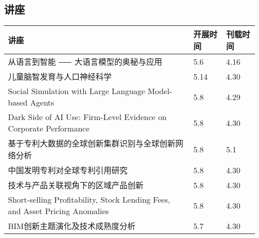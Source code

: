 \documentclass[letterpaper, 12pt]{article}
\begin{document}
\begin{multicols}{2}
\pagebreak

\section{讲座}
\begin{tabular}{|>{\centering\arraybackslash}m{}|m{}|m{}|}
    \hline
    讲座 & 开展时间 & 刊载时间\\
    \hline\hline
    从语言到智能 ⸺ 大语言模型的奥秘与应用 & 5.6 & 4.16\\\hline
    儿童脑智发育与人口神经科学 & 5.14 & 4.30\\\hline
    Social Simulation with Large Language Model-based Agents & 5.8 & 4.29\\\hline
    Dark Side of AI Use: Firm-Level Evidence on Corporate Performance & 5.8 & 4.30\\\hline
    基于专利大数据的全球创新集群识别与全球创新网络分析 & 5.8 & 5.1\\\hline
    中国发明专利对全球专利引用研究 & 5.8 & 4.30\\\hline
    技术与产品关联视角下的区域产品创新 & 5.8 & 4.30\\\hline
    Short-selling Profitability, Stock Lending Fees, and Asset Pricing Anomalies & 5.8 & 4.30\\\hline
    BIM创新主题演化及技术成熟度分析 & 5.7 & 4.30\\\hline
\end{tabular}

\end{multicols}
\end{document}
